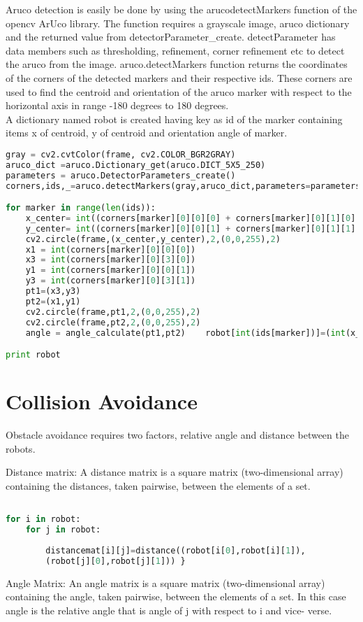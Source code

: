 \documentclass[main.tex]{subfiles}
\begin{document}
Aruco detection is easily be done by using the arucodetectMarkers function 
of the opencv ArUco library. The function requires a grayscale image, aruco 
dictionary and the returned value from  detectorParameter\_create. detectParameter 
has data members such as thresholding, refinement, corner refinement etc to 
detect the aruco from the image.
aruco.detectMarkers function returns the coordinates of the corners of the 
detected markers and their respective ids.
These corners are used to find the centroid and orientation of the aruco 
marker with respect to the horizontal axis in range -180 degrees to 180 
degrees.\\
A dictionary named robot is created having key as id of the marker 
containing items x of centroid,  y of centroid and orientation angle of 
marker.
\begin{lstlisting}[language=Python, caption = Robot id as dictionary key with item centroid and angle]
gray = cv2.cvtColor(frame, cv2.COLOR_BGR2GRAY)
aruco_dict =aruco.Dictionary_get(aruco.DICT_5X5_250)
parameters = aruco.DetectorParameters_create()
corners,ids,_=aruco.detectMarkers(gray,aruco_dict,parameters=parameters)

for marker in range(len(ids)):
	x_center= int((corners[marker][0][0][0] + corners[marker][0][1][0] + corners[marker][0][2][0] + corners[marker][0][3][0])/4)
	y_center= int((corners[marker][0][0][1] + corners[marker][0][1][1] + corners[marker][0][2][1] + corners[marker][0][3][1])/4)
	cv2.circle(frame,(x_center,y_center),2,(0,0,255),2)
	x1 = int(corners[marker][0][0][0])
	x3 = int(corners[marker][0][3][0])
	y1 = int(corners[marker][0][0][1])
	y3 = int(corners[marker][0][3][1])           
	pt1=(x3,y3)
	pt2=(x1,y1)
	cv2.circle(frame,pt1,2,(0,0,255),2)
	cv2.circle(frame,pt2,2,(0,0,255),2)
	angle = angle_calculate(pt1,pt2)	robot[int(ids[marker])]=(int(x_center),int(y_center),int(angle))

print robot
\end{lstlisting}

\pagebreak	
\section{Collision Avoidance}
Obstacle avoidance requires two factors, relative angle and distance between the robots.

Distance matrix: A distance matrix is a square matrix (two-dimensional array) containing the distances, taken pairwise, between the elements of a set.
\begin{lstlisting}[language=Python, caption = Distance Matrix ]

for i in robot:
	for j in robot:
	
		distancemat[i][j]=distance((robot[i[0],robot[i][1]),
		(robot[j][0],robot[j][1])) }
\end{lstlisting}
Angle Matrix: An angle matrix is a square matrix (two-dimensional array) containing the angle, taken pairwise, between the elements of a set. In this case angle is the relative angle that is angle of j with respect to i and vice- verse.
\end{document}

